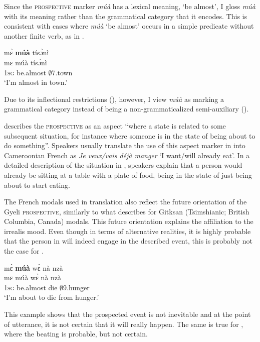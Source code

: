 Since the \textsc{prospective} marker {\itshape múà} has a lexical meaning, `be almost', I gloss {\itshape múà} with its meaning rather than the grammatical category that it encodes. This is consistent with cases where {\itshape múà} `be almost' occurs in a simple predicate without another finite verb, as in .

\ea\label{Rmua1}
  \glll mɛ̀ {\bfseries múà} tísɔ̀nì  \\
       mɛ múà tísɔ̀nì  \\
         1\textsc{sg} be.almost $\emptyset$7.town\\
    \trans `I'm almost in town.'
\z


\noindent Due to its inflectional restrictions (), however, I view {\itshape múà} as marking a grammatical category instead of being a non-grammaticalized semi-auxiliary ().

\citet[64]{comrie76} describes the \textsc{prospective}  as an aspect ``where a state is related to some subsequent situation, for instance where someone is in the state of being about to do something''.   Speakers usually translate the use of this aspect marker in  into Cameroonian French as {\itshape Je veux/vais déjà manger} `I want/will already eat'. In a detailed description of the situation in , speakers explain that a person would already be sitting  at a table with a plate of food,  being in the state of just being about to start eating.

The French modals used in translation also reflect the future orientation of the Gyeli \textsc{prospective}, similarly to what \citet{matthewson2012} describes for Gitksan (Tsimshianic; British Columbia, Canada) modals. This future orientation explains the affiliation to the irrealis mood. Even though in terms of alternative realities, it is highly probable that the person in  will indeed engage in the described event, this is probably not the case for .

\ea\label{muaa}
  \glll  mɛ̀ {\bfseries múà} wɛ̀ nà nzà \\
        mɛ múà wɛ̀ nà nzà \\
          1\textsc{sg} be.almost die {\COM} $\emptyset$9.hunger\\
    \trans `I'm about to die from hunger.'
\z

\noindent This example shows that the prospected event is not inevitable and at the point of utterance, it is not certain that it will really happen. The same is true for , where the beating is probable, but not certain.

